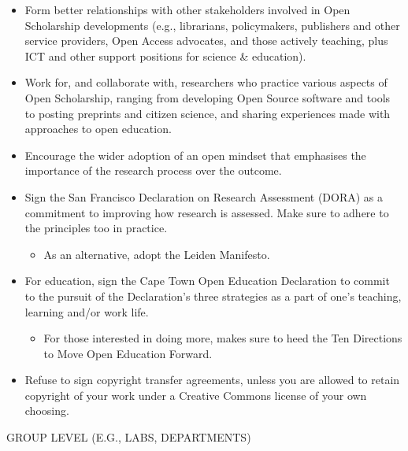 \documentclass[]{article}
\providecommand{\tightlist}{%
  \setlength{\itemsep}{0pt}\setlength{\parskip}{0pt}}
\begin{document}
\begin{itemize}
\item
  Form better relationships with other stakeholders involved in Open
  Scholarship developments (e.g., librarians, policymakers, publishers
  and other service providers, Open Access advocates, and those actively
  teaching, plus ICT and other support positions for science \&
  education).
\item
  Work for, and collaborate with, researchers who practice various
  aspects of Open Scholarship, ranging from developing Open Source
  software and tools to posting preprints and citizen science, and
  sharing experiences made with approaches to open education.
\item
  Encourage the wider adoption of an open mindset that emphasises the
  importance of the research process over the outcome.
\item
  Sign the San Francisco Declaration on Research Assessment (DORA) as a
  commitment to improving how research is assessed. Make sure to adhere
  to the principles too in practice.

  \begin{itemize}
  \tightlist
  \item
    As an alternative, adopt the Leiden Manifesto.
  \end{itemize}
\item
  For education, sign the Cape Town Open Education Declaration to commit
  to the pursuit of the Declaration's three strategies as a part of
  one's teaching, learning and/or work life.

  \begin{itemize}
  \tightlist
  \item
    For those interested in doing more, makes sure to heed the Ten
    Directions to Move Open Education Forward.
  \end{itemize}
\item
  Refuse to sign copyright transfer agreements, unless you are allowed
  to retain copyright of your work under a Creative Commons license of
  your own choosing.
\end{itemize}

GROUP LEVEL (E.G., LABS, DEPARTMENTS)
\end{document}
